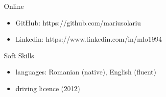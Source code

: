\documentclass[]{mcdowellcv}
\begin{document}
	\begin{cvsection}{Online}
		\begin{cvsubsection}{}{}{}
			\begin{itemize}
				\item GitHub: https://github.com/mariusolariu
				\item Linkedin: https://www.linkedin.com/in/mlo1994
			\end{itemize}
		\end{cvsubsection}
	\end{cvsection}

	\begin{cvsection}{Soft Skills}
		\begin{cvsubsection}{}{}{}
			\begin{itemize}
				\item languages: Romanian (native), English (fluent)
				\item driving licence (2012)
			\end{itemize}
		\end{cvsubsection}
	\end{cvsection}
	
\end{document}
